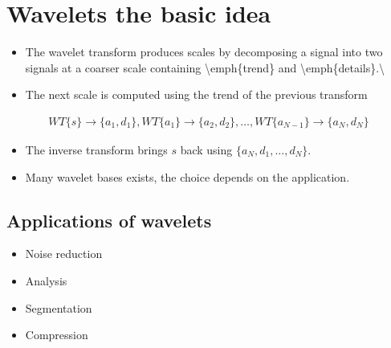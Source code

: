 \documentclass[letterpaper,10pt,english]{sphinxmanual}
\begin{document}
\section{Wavelets \sphinxhyphen{} the basic idea}
\label{\detokenize{02-ImageEnhancement:wavelets-the-basic-idea}}\begin{itemize}
\item {} 
\sphinxAtStartPar
The wavelet transform produces scales by decomposing a signal into two signals at a coarser scale containing \textbackslash{}emph\{trend\} and \textbackslash{}emph\{details\}.\textbackslash{}

\item {} 
\sphinxAtStartPar
The next scale is computed using the trend of the previous transform

\end{itemize}
\begin{equation*}
\begin{split}WT\{s\}\rightarrow\{a_1,d_1\}, WT\{a_1\}\rightarrow\{a_2,d_2\}, \ldots, WT\{a_{N-1}\}\rightarrow\{a_N,d_N\} \end{split}
\end{equation*}\begin{itemize}
\item {} 
\sphinxAtStartPar
The inverse transform brings \(s\) back using \(\{a_N,d_1, \ldots,d_N\}\).

\item {} 
\sphinxAtStartPar
Many wavelet bases exists, the choice depends on the application.

\end{itemize}


\subsection{Applications of wavelets}
\label{\detokenize{02-ImageEnhancement:applications-of-wavelets}}\begin{itemize}
\item {} 
\sphinxAtStartPar
Noise reduction

\item {} 
\sphinxAtStartPar
Analysis

\item {} 
\sphinxAtStartPar
Segmentation

\item {} 
\sphinxAtStartPar
Compression

\end{itemize}
\end{document}
